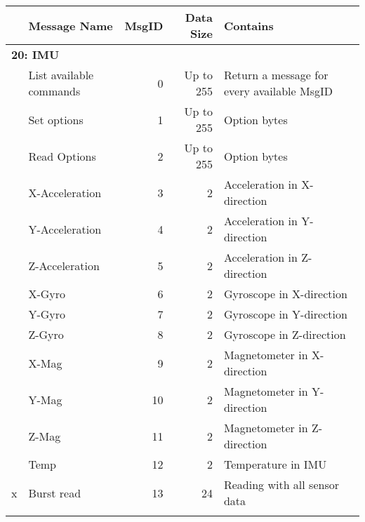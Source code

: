 \begin{sidewaystable}[h]
\centering
	\begin{tabular}{llrrl}
	\toprule
	& \textbf{Message Name} & \textbf{MsgID} & \textbf{Data Size} & \textbf{Contains}\\
	\midrule
	\multicolumn{5}{l}{\textbf{20: IMU}}\\
	\midrule
	& List available commands & 0 & Up to 255 & Return a message for every available MsgID\\
	& Set options & 1 & Up to 255 & Option bytes\\
	& Read Options & 2 & Up to 255 & Option bytes\\
	& X-Acceleration & 3 & 2 & Acceleration in X-direction\\
	& Y-Acceleration & 4 & 2 & Acceleration in Y-direction\\
	& Z-Acceleration & 5 & 2 & Acceleration in Z-direction\\
	& X-Gyro & 6 & 2 & Gyroscope in X-direction\\
	& Y-Gyro & 7 & 2 & Gyroscope in Y-direction\\
	& Z-Gyro & 8 & 2 & Gyroscope in Z-direction\\
	& X-Mag & 9 & 2 & Magnetometer in X-direction\\
	& Y-Mag & 10 & 2 & Magnetometer in Y-direction\\
	& Z-Mag & 11 & 2 & Magnetometer in Z-direction\\
	& Temp & 12 & 2 & Temperature in IMU\\
	x& Burst read & 13 & 24 & Reading with all sensor data\\
	\midrule
	\label{tab:commands}
	\end{tabular}
\caption{}
\label{tab:msg3}
\end{sidewaystable}
\newpage
